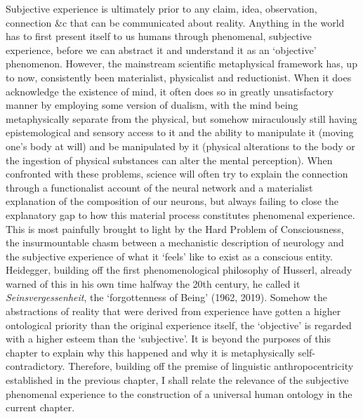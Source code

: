 Subjective experience is ultimately prior to any claim, idea, observation, connection \&c that can be communicated about reality. Anything in the world has to first present itself to us humans through phenomenal, subjective experience, before we can abstract it and understand it as an ‘objective’ phenomenon. However, the mainstream scientific metaphysical framework has, up to now, consistently been materialist, physicalist and reductionist. When it does acknowledge the existence of mind, it often does so in greatly unsatisfactory manner by employing some version of dualism, with the mind being metaphysically separate from the physical, but somehow miraculously still having epistemological and sensory access to it and the ability to manipulate it (moving one’s body at will) and be manipulated by it (physical alterations to the body or the ingestion of physical substances can alter the mental perception). When confronted with these problems, science will often try to explain the connection through a functionalist account of the neural network and a materialist explanation of the composition of our neurons, but always failing to close the explanatory gap to how this material process constitutes phenomenal experience. This is most painfully brought to light by the Hard Problem of Consciousness, the insurmountable chasm between a mechanistic description of neurology and the subjective experience of what it ‘feels’ like to exist as a conscious entity. Heidegger, building off the first phenomenological philosophy of Husserl, already warned of this in his own time halfway the 20th century, he called it \textit{Seinsvergessenheit}, the ‘forgottenness of Being’ (1962, 2019). Somehow the abstractions of reality that were derived from experience have gotten a higher ontological priority than the original experience itself, the ‘objective’ is regarded with a higher esteem than the ‘subjective’. It is beyond the purposes of this chapter to explain why this happened and why it is metaphysically self-contradictory. Therefore, building off the premise of linguistic anthropocentricity established in the previous chapter, I shall relate the relevance of the subjective phenomenal experience to the construction of a universal human ontology in the current chapter. 


